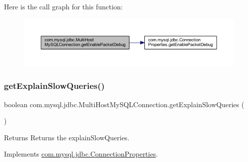 Here is the call graph for this function\+:
\nopagebreak
\begin{figure}[H]
\begin{center}
\leavevmode
\includegraphics[width=350pt]{classcom_1_1mysql_1_1jdbc_1_1_multi_host_my_s_q_l_connection_a4f5817273d152c100a22b77fa4cf957f_cgraph}
\end{center}
\end{figure}
\mbox{\label{classcom_1_1mysql_1_1jdbc_1_1_multi_host_my_s_q_l_connection_a338dacd49865ecaa1edaad1fa98e85a6}} 
\subsubsection{\texorpdfstring{get\+Explain\+Slow\+Queries()}{getExplainSlowQueries()}}
{\footnotesize\ttfamily boolean com.\+mysql.\+jdbc.\+Multi\+Host\+My\+S\+Q\+L\+Connection.\+get\+Explain\+Slow\+Queries (\begin{DoxyParamCaption}{ }\end{DoxyParamCaption})}

\begin{DoxyReturn}{Returns}
Returns the explain\+Slow\+Queries. 
\end{DoxyReturn}


Implements \mbox{\hyperlink{interfacecom_1_1mysql_1_1jdbc_1_1_connection_properties_a51ec93b6fe482627e109814e0985c940}{com.\+mysql.\+jdbc.\+Connection\+Properties}}.

